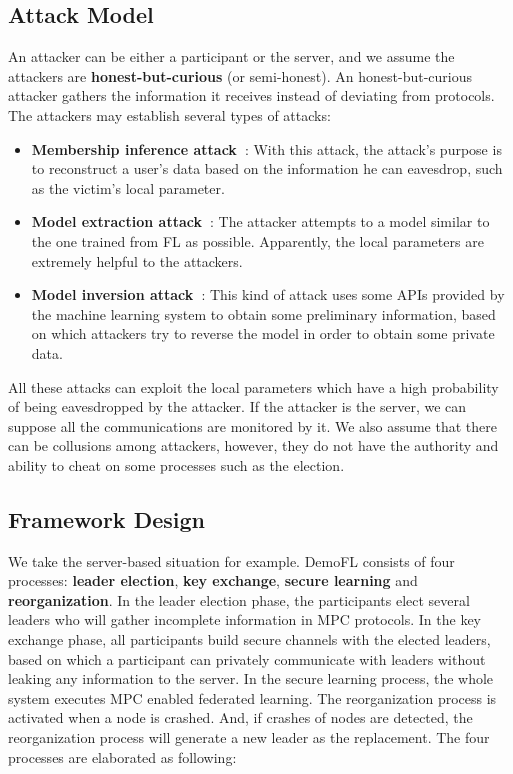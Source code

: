 \subsection{Attack Model}
An attacker can be either a participant or the server, and we assume the attackers are \textbf{honest-but-curious} (or semi-honest). An honest-but-curious attacker gathers the information it receives instead of deviating from protocols. The attackers may establish several types of attacks:

\begin{itemize}
    \item \textbf{Membership inference attack~\cite{Shokri17}}: With this attack, the attack's purpose is to reconstruct a user's data based on the information he can eavesdrop, such as the victim's local parameter.

    \item \textbf{Model extraction attack~\cite{Tramer16}}: The attacker attempts to a model similar to the one trained from FL as possible. Apparently, the local parameters are extremely helpful to the attackers.

    \item \textbf{Model inversion attack~\cite{Fredrikson15}}: This kind of attack uses some APIs provided by the machine learning system to obtain some preliminary information, based on which attackers try to reverse the model in order to obtain some private data.

\end{itemize}

All these attacks can exploit the local parameters which have a high probability of being eavesdropped by the attacker. If the attacker is the server, we can suppose all the communications are monitored by it. We also assume that there can be collusions among attackers, however, they do not have the authority and ability to cheat on some processes such as the election.


\subsection{Framework Design}
We take the server-based situation for example. DemoFL consists of four processes: \textbf{leader election}, \textbf{key exchange}, \textbf{secure learning} and \textbf{reorganization}. In the leader election phase, the participants elect several leaders who will gather incomplete information in MPC protocols. In the key exchange phase, all participants build secure channels with the elected leaders, based on which a participant can privately communicate with leaders without leaking any information to the server. In the secure learning process, the whole system executes MPC enabled federated learning. The reorganization process is activated when a node is crashed. And, if crashes of nodes are detected, the reorganization process will generate a new leader as the replacement. The four processes are elaborated as following:


